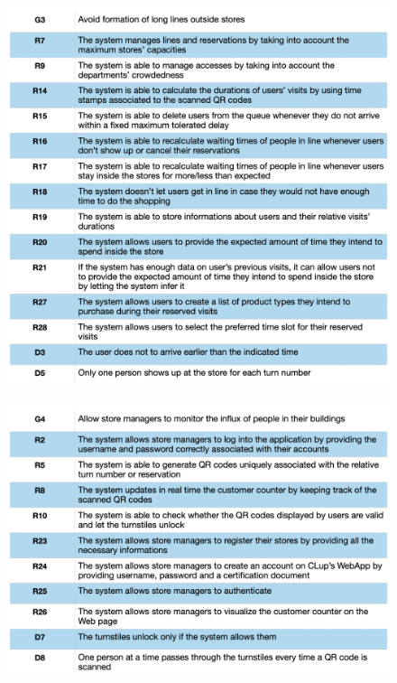 \documentclass{article}
\begin{document}
\begin{figure}[H]
  \includegraphics[width=\linewidth]{Mapping3.png}
  
\end{figure}

\begin{figure}[H]
  \includegraphics[width=\linewidth]{Mapping4.png}
  
\end{figure}
\end{document}
